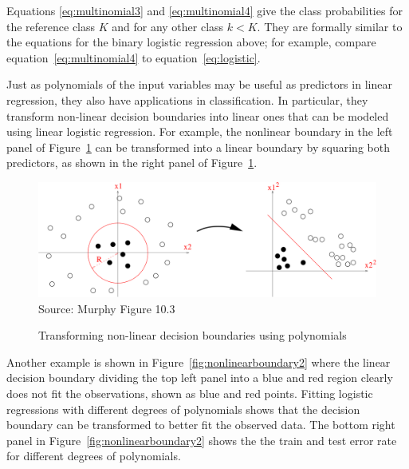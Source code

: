 Equations \ref{eq:multinomial3} and \ref{eq:multinomial4} give the class probabilities for the reference class $K$ and for any other class $k < K$. They are formally similar to the equations for the binary logistic regression above; for example, compare equation~\ref{eq:multinomial4} to equation~\ref{eq:logistic}.

Just as polynomials of the input variables may be useful as predictors in linear regression, they also have applications in classification. In particular, they transform non-linear decision boundaries into linear ones that can be modeled using linear logistic regression. For example, the nonlinear boundary in the left panel of Figure~\ref{fig:nonlinearboundary} can be transformed into a linear boundary by squaring both predictors, as shown in the right panel of Figure~\ref{fig:nonlinearboundary}.

\begin{figure}
\centering
\includegraphics[width=.8\textwidth]{Figure_10.3.png} \\
\scriptsize Source: Murphy Figure 10.3
\caption{Transforming non-linear decision boundaries using polynomials}
\label{fig:nonlinearboundary}
\end{figure}

Another example is shown in Figure~\ref{fig:nonlinearboundary2} where the linear decision boundary dividing the top left panel into a blue and red region clearly does not fit the observations, shown as blue and red points. Fitting logistic regressions with different degrees of polynomials shows that the decision boundary can be transformed to better fit the observed data. The bottom right panel in Figure~\ref{fig:nonlinearboundary2} shows the the train and test error rate for different degrees of polynomials. 

